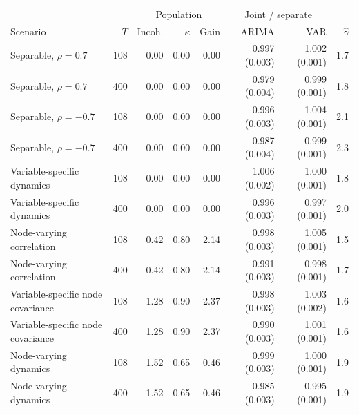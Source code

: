 \centering\small
\begin{tabular}{lrrrrrrr}
\hline
 & & \multicolumn{3}{c}{Population} & \multicolumn{2}{c}{Joint / separate} & \\
Scenario & $T$ & Incoh. & $\kappa$ & Gain & ARIMA & VAR & $\widehat\gamma$ \\
\hline
Separable, $\rho = 0.7$ & 108 & 0.00 & 0.00 & 0.00 & 0.997 (0.003) & 1.002 (0.001) & 1.7 \\
Separable, $\rho = 0.7$ & 400 & 0.00 & 0.00 & 0.00 & 0.979 (0.004) & 0.999 (0.001) & 1.8 \\
Separable, $\rho = -0.7$ & 108 & 0.00 & 0.00 & 0.00 & 0.996 (0.003) & 1.004 (0.001) & 2.1 \\
Separable, $\rho = -0.7$ & 400 & 0.00 & 0.00 & 0.00 & 0.987 (0.004) & 0.999 (0.001) & 2.3 \\
Variable-specific dynamics & 108 & 0.00 & 0.00 & 0.00 & 1.006 (0.002) & 1.000 (0.001) & 1.8 \\
Variable-specific dynamics & 400 & 0.00 & 0.00 & 0.00 & 0.996 (0.003) & 0.997 (0.001) & 2.0 \\
Node-varying correlation & 108 & 0.42 & 0.80 & 2.14 & 0.998 (0.003) & 1.005 (0.001) & 1.5 \\
Node-varying correlation & 400 & 0.42 & 0.80 & 2.14 & 0.991 (0.003) & 0.998 (0.001) & 1.7 \\
Variable-specific node covariance & 108 & 1.28 & 0.90 & 2.37 & 0.998 (0.003) & 1.003 (0.002) & 1.6 \\
Variable-specific node covariance & 400 & 1.28 & 0.90 & 2.37 & 0.990 (0.003) & 1.001 (0.001) & 1.6 \\
Node-varying dynamics & 108 & 1.52 & 0.65 & 0.46 & 0.999 (0.003) & 1.000 (0.001) & 1.9 \\
Node-varying dynamics & 400 & 1.52 & 0.65 & 0.46 & 0.985 (0.003) & 0.995 (0.001) & 1.9 \\
\hline
\end{tabular}
